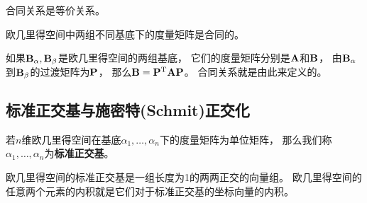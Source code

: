 \begin{remark}
  合同关系是等价关系。
\end{remark}

\begin{theorem}[不同基底下的度量矩阵的关系] \label{thrm-metric-mat-rel}
  欧几里得空间中两组不同基底下的度量矩阵是合同的。
\end{theorem}

\begin{remark}
  如果$\mathbf{B}_{\alpha},\mathbf{B}_{\beta}$是欧几里得空间的两组基底，
  它们的度量矩阵分别是$\mathbf{A}$和$\mathbf{B}$，
  由$\mathbf{B}_{\alpha}$到$\mathbf{B}_{\beta}$的过渡矩阵为$\mathbf{P}$，
  那么$\mathbf{B}=\mathbf{P}^{\textrm{T}}\mathbf{A}\mathbf{P}$。
  合同关系就是由此来定义的。
\end{remark}

\subsection{标准正交基与施密特(Schmit)正交化}
\begin{definition}[标准正交基]
  若$n$维欧几里得空间在基底$\alpha_1,\dots,\alpha_n$下的度量矩阵为单位矩阵，
  那么我们称$\alpha_1,\dots,\alpha_n$为\textbf{标准正交基}。
\end{definition}

\begin{remark}
  欧几里得空间的标准正交基是一组长度为1的两两正交的向量组。
  欧几里得空间的任意两个元素的内积就是它们对于标准正交基的坐标向量的内积。
\end{remark}

